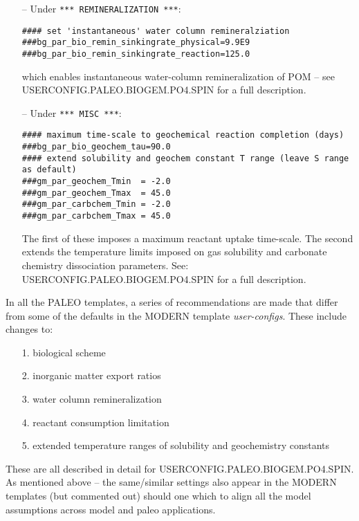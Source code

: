 \documentclass[11pt,fleqn]{book} %
\begin{document}
\begin{itemize}[leftmargin=0.6in]
\vspace{1mm}
\item[--] Under \texttt{*** REMINERALIZATION ***}:
\small\vspace{-1mm}\begin{verbatim}
#### set 'instantaneous' water column remineralziation
###bg_par_bio_remin_sinkingrate_physical=9.9E9
###bg_par_bio_remin_sinkingrate_reaction=125.0
\end{verbatim}\vspace{-1mm}\normalsize
which enables instantaneous water-column remineralization of POM -- see \linebreak \textsf{\footnotesize USERCONFIG.PALEO.BIOGEM.PO4.SPIN} for a full description.
\vspace{1mm}
\item[--] Under \texttt{*** MISC ***}:
\small\vspace{-1mm}\begin{verbatim}
#### maximum time-scale to geochemical reaction completion (days)
###bg_par_bio_geochem_tau=90.0
#### extend solubility and geochem constant T range (leave S range as default)
###gm_par_geochem_Tmin  = -2.0
###gm_par_geochem_Tmax  = 45.0
###gm_par_carbchem_Tmin = -2.0
###gm_par_carbchem_Tmax = 45.0
\end{verbatim}\vspace{-1mm}\normalsize
The first of these imposes a maximum reactant uptake time-scale. The second extends the temperature limits imposed on gas solubility and carbonate chemistry dissociation parameters. See: \textsf{\footnotesize USERCONFIG.PALEO.BIOGEM.PO4.SPIN} for a full description.
\end{itemize}

\vspace{1mm}
In  all the PALEO templates, a series of recommendations are made that differ from some of the defaults in the MODERN template \textit{user-configs}. These include changes to:
\begin{itemize}[leftmargin=0.6in]
\item[1.] biological scheme
\item[2.] inorganic matter export ratios
\item[3.] water column remineralization
\item[4.] reactant consumption limitation
\item[5.] extended temperature ranges of solubility and geochemistry constants
\end{itemize}
These are all described in detail for \textsf{\footnotesize USERCONFIG.PALEO.BIOGEM.PO4.SPIN}.
\\\noindent As mentioned above -- the same/similar settings also appear in the MODERN templates (but commented out) should one which to align all the model assumptions across model and paleo applications.
\end{document}
